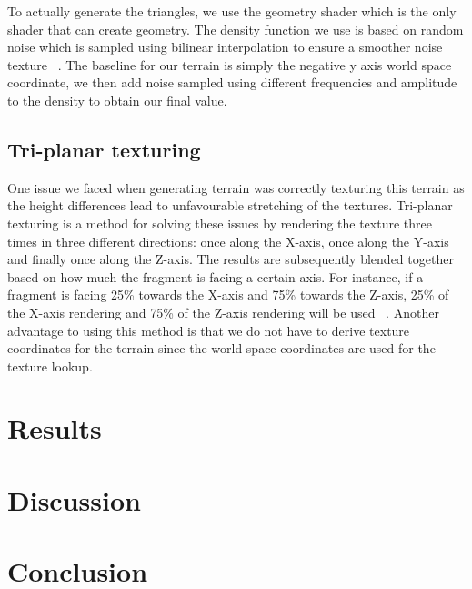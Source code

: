 \documentclass{acmsiggraph}               %
\begin{document}
To actually generate the triangles, we use the geometry shader which is the only shader that can
create geometry. The density function we use is based on random noise which is sampled using
bilinear interpolation to ensure a smoother noise texture ~\cite{lodev}. The baseline for our
terrain is simply the negative y axis world space coordinate, we then add noise sampled using
different frequencies and amplitude to the density to obtain our final value.

\subsection{Tri-planar texturing}
One issue we faced when generating terrain was correctly texturing this terrain as the height
differences lead to unfavourable stretching of the textures. Tri-planar texturing is a method
for solving these issues by rendering the texture three times in three different directions:
once along the X-axis, once along the Y-axis and finally once along the Z-axis. The results
are subsequently blended together based on how much the fragment is facing a certain axis. For
instance, if a fragment is facing 25\% towards the X-axis and 75\% towards the Z-axis, 25\% of
the X-axis rendering and 75\% of the Z-axis rendering will be used ~\cite{Owens2014}.
Another advantage to using this method is that we do not have to derive texture coordinates for
the terrain since the world space coordinates are used for the texture lookup.

\section{Results}

\section{Discussion}

\section{Conclusion}




\end{document}
